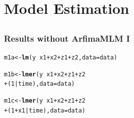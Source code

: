 \documentclass{beamer}\usepackage[]{graphicx}\usepackage[]{color}
\makeatletter
\newcommand{\hlnum}[1]{\textcolor[rgb]{0.686,0.059,0.569}{#1}}%
\newcommand{\hlopt}[1]{\textcolor[rgb]{0,0,0}{#1}}%
\newcommand{\hlstd}[1]{\textcolor[rgb]{0.345,0.345,0.345}{#1}}%
\newcommand{\hlkwb}[1]{\textcolor[rgb]{0.69,0.353,0.396}{#1}}%
\newcommand{\hlkwc}[1]{\textcolor[rgb]{0.333,0.667,0.333}{#1}}%
\newcommand{\hlkwd}[1]{\textcolor[rgb]{0.737,0.353,0.396}{\textbf{#1}}}%
\newenvironment{kframe}{%
 \def\at@end@of@kframe{}%
 \ifinner\ifhmode%
  \def\at@end@of@kframe{\end{minipage}}%
  \begin{minipage}{\columnwidth}%
 \fi\fi%
 \def\FrameCommand##1{\hskip\@totalleftmargin \hskip-\fboxsep
 \colorbox{shadecolor}{##1}\hskip-\fboxsep
     \hskip-\linewidth \hskip-\@totalleftmargin \hskip\columnwidth}%
 \MakeFramed {\advance\hsize-\width
   \@totalleftmargin\z@ \linewidth\hsize
   \@setminipage}}%
 {\par\unskip\endMakeFramed%
 \at@end@of@kframe}
\newenvironment{knitrout}{}{} %
\makeatother
\begin{document}
\section{Model Estimation}
\subsection{}
\begin{frame}[fragile]%
\frametitle{Results without ArfimaMLM I}
\begin{knitrout}
\color{fgcolor}\begin{kframe}
\begin{alltt}
\hlstd{m1a} \hlkwb{<-} \hlkwd{lm}\hlstd{(y} \hlopt{~} \hlstd{x1} \hlopt{+} \hlstd{x2} \hlopt{+} \hlstd{z1} \hlopt{+} \hlstd{z2,} \hlkwc{data} \hlstd{= data)}

\hlstd{m1b} \hlkwb{<-} \hlkwd{lmer}\hlstd{(y} \hlopt{~} \hlstd{x1} \hlopt{+} \hlstd{x2} \hlopt{+} \hlstd{z1} \hlopt{+} \hlstd{z2}
            \hlopt{+} \hlstd{(}\hlnum{1} \hlopt{|} \hlstd{time),} \hlkwc{data} \hlstd{= data)}

\hlstd{m1c} \hlkwb{<-} \hlkwd{lmer}\hlstd{(y} \hlopt{~} \hlstd{x1} \hlopt{+} \hlstd{x2} \hlopt{+} \hlstd{z1} \hlopt{+} \hlstd{z2}
            \hlopt{+} \hlstd{(}\hlnum{1} \hlopt{+} \hlstd{x1} \hlopt{|} \hlstd{time),} \hlkwc{data} \hlstd{= data)}
\end{alltt}
\end{kframe}
\end{knitrout}
\end{frame}
\end{document}
